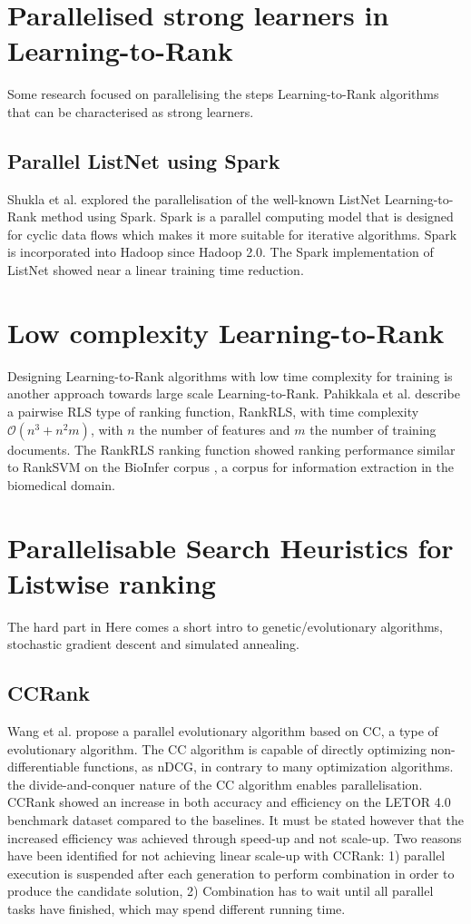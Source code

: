 \section{Parallelised strong learners in Learning-to-Rank}
Some research focused on parallelising the steps Learning-to-Rank algorithms that can be characterised as strong learners.
\subsection{Parallel ListNet using Spark}
Shukla et al. \cite{Shukla2012} explored the parallelisation of the well-known ListNet Learning-to-Rank method using Spark. Spark is a parallel computing model that is designed for cyclic data flows which makes it more suitable for iterative algorithms. Spark is incorporated into Hadoop since Hadoop 2.0. The Spark implementation of ListNet showed near a linear training time reduction.\\

\section{Low complexity Learning-to-Rank}
Designing Learning-to-Rank algorithms with low time complexity for training is another approach towards large scale Learning-to-Rank. Pahikkala et al. \cite{Pahikkala2009} describe a pairwise \ac{RLS} type of ranking function, RankRLS, with time complexity $\mathcal{O}(n^3+n^2m)$, with $n$ the number of features and $m$ the number of training documents. The RankRLS ranking function showed ranking performance similar to RankSVM on the BioInfer corpus \cite{Pyysalo2007}, a corpus for information extraction in the biomedical domain.\\

\section{Parallelisable Search Heuristics for Listwise ranking}
The hard part in 
Here comes a short intro to genetic/evolutionary algorithms, stochastic gradient descent and simulated annealing.
\subsection{CCRank}
Wang et al. \cite{Wang2011a,Wang2011b} propose a parallel evolutionary algorithm based on \ac{CC}, a type of evolutionary algorithm. The \ac{CC} algorithm is capable of directly optimizing non-differentiable functions, as \ac{nDCG}, in contrary to many optimization algorithms.  the divide-and-conquer nature of the \ac{CC} algorithm enables parallelisation. CCRank showed an increase in both accuracy and efficiency on the LETOR 4.0 benchmark dataset compared to the baselines. It must be stated however that the increased efficiency was achieved through speed-up and not scale-up. Two reasons have been identified for not achieving linear scale-up with CCRank: 1) parallel execution is suspended after each generation to perform combination in order to produce the candidate solution, 2) Combination has to wait until all parallel tasks have finished, which may spend different running time.
